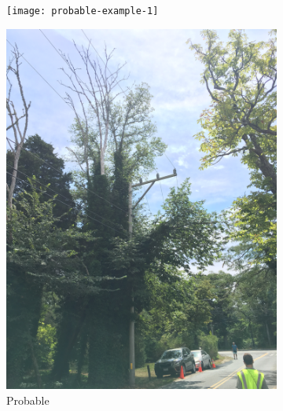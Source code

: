 \documentclass[Journal, letterpaper, DoubleSpace, InsideFigs]{ascelike-new}
\begin{document}
\begin{figure}[ht]
  \centering
  \begin{subfigure}[t]{.325\linewidth}\centering
    \texttt{[image: probable-example-1]} %

    \includegraphics[width=\textwidth,keepaspectratio=true,angle=-90]{probable-example-2} %
    \caption{Probable}
  \end{subfigure}
  \begin{subfigure}[t]{.325\linewidth}\centering

\end{subfigure}
\end{figure}
\end{document}
